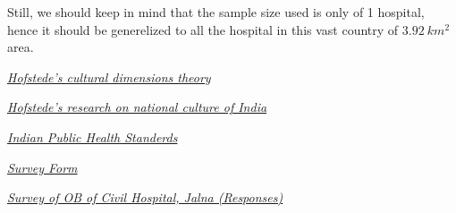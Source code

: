 \documentclass{article}
\begin{document}
Still, we should keep in mind that the sample size used is only of 1 hospital, hence it should be generelized to all the hospital in this vast country of $3.92\ km^2$ area.

\newpage
\begin{thebibliography}{99}

    {\em \href{https://en.wikipedia.org/wiki/Hofstede%27s_cultural_dimensions_theory#Dimensions_of_national_culturess/}{Hofstede's cultural dimensions theory}}

    {\em \href{https://www.hofstede-insights.com/country-comparison/india/}{Hofstede's research on national culture of India}}

    {\em \href{https://nhm.gov.in/images/pdf/guidelines/iphs/iphs-revised-guidlines-2022/01-SDH_DH_IPHS_Guidelines-2022.pdf}{Indian Public Health Standerds}}

    {\em \href{https://drive.google.com/file/d/1fBm0hNM2xrKJiMaiN55BHcJJa5gY-k8D/view?usp=share_link}{Survey Form}}

    {\em \href{https://docs.google.com/spreadsheets/d/13JBPbaedCzGmHHtawIFe-Poizsp84CtahEr07WUdKAw/edit?usp=sharing}{Survey of OB of Civil Hospital, Jalna (Responses)}}

\end{thebibliography}
\end{document}
